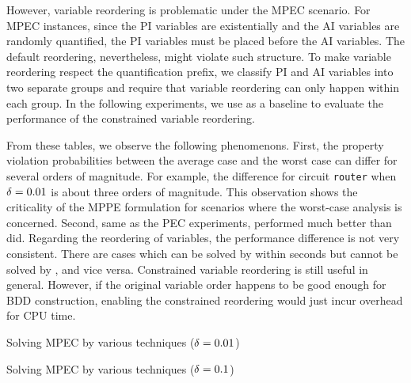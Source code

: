 However, variable reordering is problematic under the MPEC scenario.
For MPEC instances, since the PI variables are existentially and the AI variables are randomly quantified,
the PI variables must be placed before the AI variables.
The default reordering, nevertheless, might violate such structure.
To make variable reordering respect the quantification prefix,
we classify PI and AI variables into two separate groups and
require that variable reordering can only happen within each group.
In the following experiments, we use \bddspnr as a baseline
to evaluate the performance of the constrained variable reordering.

From these tables, we observe the following phenomenons.
First, the property violation probabilities between the average case and the worst case
can differ for several orders of magnitude.
For example, the difference for circuit \texttt{router} when $\delta=0.01$ is about three orders of magnitude.
This observation shows the criticality of the MPPE formulation for scenarios
where the worst-case analysis is concerned.
Second, same as the PEC experiments, \bddsp performed much better than \dcssat did.
Regarding the reordering of variables,
the performance difference is not very consistent.
There are cases which can be solved by \bddsp within seconds but cannot be solved by \bddspnr, and vice versa.
Constrained variable reordering is still useful in general.
However, if the original variable order happens to be good enough for BDD construction,
enabling the constrained reordering would just incur overhead for CPU time.

\begin{table}[ht]
    \centering
    \scriptsize
    \caption{Solving MPEC by various techniques ($\delta=0.01$)}
    \label{tbl:prob-design-eval-mpec-0.01}
\end{table}

\begin{table}[ht]
    \centering
    \scriptsize
    \caption{Solving MPEC by various techniques ($\delta=0.1$)}
    \label{tbl:prob-design-eval-mpec-0.10}
\end{table}